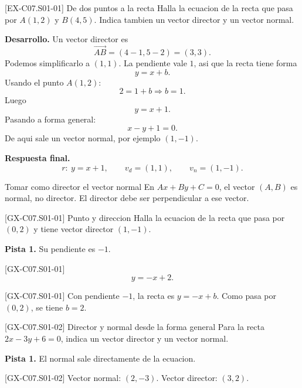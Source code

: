 \begin{solvedexample}{[EX-C07.S01-01] De dos puntos a la recta}
Halla la ecuacion de la recta que pasa por \(A(1,2)\) y \(B(4,5)\). Indica tambien un vector
director y un vector normal.

\textbf{Desarrollo.} Un vector director es
\[
\overrightarrow{AB}=(4-1,5-2)=(3,3).
\]
Podemos simplificarlo a \((1,1)\). La pendiente vale \(1\), asi que la recta tiene forma
\[
y=x+b.
\]
Usando el punto \(A(1,2)\):
\[
2=1+b \Longrightarrow b=1.
\]
Luego
\[
y=x+1.
\]
Pasando a forma general:
\[
x-y+1=0.
\]
De aqui sale un vector normal, por ejemplo \((1,-1)\).

\textbf{Respuesta final.}
\[
r:\ y=x+1,
\qquad
v_d=(1,1),
\qquad
v_n=(1,-1).
\]
\end{solvedexample}

\begin{commonerror}{Tomar como director el vector normal}
En \(Ax+By+C=0\), el vector \((A,B)\) es normal, no director. El director debe ser
perpendicular a ese vector.
\end{commonerror}

\begin{guidedexercise}{[GX-C07.S01-01] Punto y direccion}
Halla la ecuacion de la recta que pasa por \((0,2)\) y tiene vector director \((1,-1)\).

\textbf{Pista 1.} Su pendiente es \(-1\).
\end{guidedexercise}

\begin{shortanswer}{[GX-C07.S01-01]}
\[
y=-x+2.
\]
\end{shortanswer}

\begin{fullsolution}{[GX-C07.S01-01]}
Con pendiente \(-1\), la recta es \(y=-x+b\). Como pasa por \((0,2)\), se tiene \(b=2\).
\end{fullsolution}

\begin{guidedexercise}{[GX-C07.S01-02] Director y normal desde la forma general}
Para la recta \(2x-3y+6=0\), indica un vector director y un vector normal.

\textbf{Pista 1.} El normal sale directamente de la ecuacion.
\end{guidedexercise}

\begin{shortanswer}{[GX-C07.S01-02]}
Vector normal: \((2,-3)\). Vector director: \((3,2)\).
\end{shortanswer}

